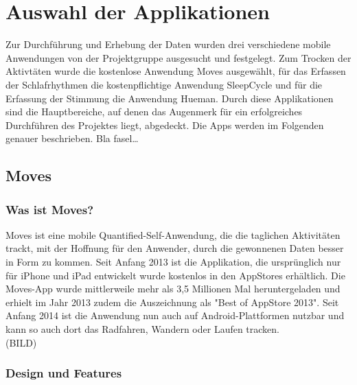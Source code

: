 
\chapter{Auswahl der Applikationen}
\label{ch:Apps}

Zur Durchführung und Erhebung der Daten wurden drei verschiedene mobile Anwendungen von der Projektgruppe ausgesucht und festgelegt. 
Zum Trocken der Aktivtäten wurde die kostenlose Anwendung Moves ausgewählt, für das Erfassen der Schlafrhythmen die kostenpflichtige Anwendung SleepCycle und für die Erfassung der Stimmung die Anwendung Hueman. 
Durch diese Applikationen sind die Hauptbereiche, auf denen das Augenmerk für ein erfolgreiches Durchführen des Projektes liegt, abgedeckt.
Die Apps werden im Folgenden genauer beschrieben.
Bla fasel\ldots



\section{Moves}
\label{ch:Apps:sec:Moves}

\subsection{Was ist Moves?}
\label{ch:Apps:sec:Moves:subsec:WIM}

Moves ist eine mobile Quantified-Self-Anwendung, die die taglichen Aktivitäten trackt, mit der Hoffnung für den Anwender, durch die gewonnenen Daten besser in Form zu kommen. 
Seit Anfang 2013 ist die Applikation, die ursprünglich nur für iPhone und iPad entwickelt wurde kostenlos in den AppStores erhältlich. 
Die Moves-App wurde mittlerweile mehr als 3,5 Millionen Mal heruntergeladen und erhielt im Jahr 2013 zudem die Auszeichnung als "Best of AppStore 2013".
Seit Anfang 2014 ist die Anwendung nun auch auf Android-Plattformen nutzbar und kann so auch dort das Radfahren, Wandern oder Laufen tracken.
\\
(BILD)

\subsection{Design und Features}
\label{ch:Apps:sec:Moves:subsec:DuF}

